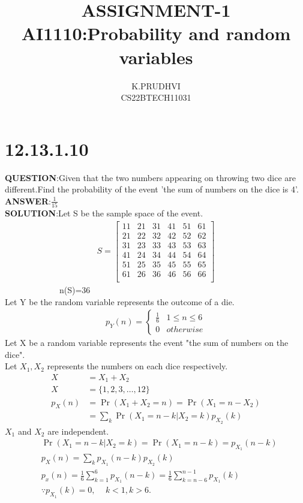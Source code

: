 \documentclass[journal,12pt,twocolumn]{IEEEtran}
\title{ASSIGNMENT-1\\AI1110:Probability and random variables}
\author{K.PRUDHVI\\CS22BTECH11031}
\providecommand{\pr}[1]{\ensuremath{\Pr\left(#1\right)}}
\theoremstyle{remark}
\begin{document}
\maketitle
\section*{\textbf{12.13.1.10}}
\noindent \textbf{QUESTION}:Given that the two numbers appearing on throwing two dice are different.Find the probability of the event 'the sum of numbers on the dice is 4'.\\
\noindent \textbf{ANSWER}:$\frac{1}{15}$\\[3pt]
\noindent \textbf{SOLUTION}:Let S be the sample space of the event.
\begin{align*}
S=
\begin{bmatrix}
11 & 21 & 31 & 41 & 51 & 61 \\
21 & 22 & 32 & 42 & 52 & 62 \\
31 & 23 & 33 & 43 & 53 & 63 \\
41 & 24 & 34 & 44 & 54 & 64 \\
51 & 25 & 35 & 45 & 55 & 65 \\
61 & 26 & 36 & 46 & 56 & 66 \\
\end{bmatrix}
\end{align*}
\ \ \ \ \ \ \ \ \ \ \ \ \ n(S)=36\\
Let Y be the random variable represents the outcome of a die.\\
\begin{align*}
  p_Y(n)=
  \begin{cases}
    \frac{1}{6} & 1 \leq n \leq 6 \\
    0 & otherwise
  \end{cases}
  \tag{1.1}
  \end{align*}
Let X be a random variable represents the event "the sum of numbers on the dice".\\
Let $X_1,X_2$ represents the numbers on each dice respectively.
\begin{align*}
X&=X_1+X_2\\
X&=\{1,2,3,\dots,12\}\\
p_X(n)&=\pr{X_1+X_2=n}=\pr{X_1=n-X_2}\\
      &=\sum_{k}\pr{X_1=n-k|X_2=k}p_{X_2}(k)
\end{align*}
$X_1$ and $X_2$ are independent.
\begin{align*}
  &\pr{X_1=n-k|X_2=k}=\pr{X_1=n-k}=p_{X_1}(n-k)\\
  &p_X(n)=\sum_k{p_{X_1}(n-k)p_{X_2}(k)}\\
  &p_x(n)=\frac{1}{6}\sum_{k=1}^{6}p_{X_1}(n-k)=\frac{1}{6}\sum_{k=n-6}^{n-1}p_{X_1}(k)  \tag{1.2}\\
  &\because p_{X_1}(k)=0,\,\,\,\,\,\,\,k<1,k>6.
\end{align*}
\end{document}
